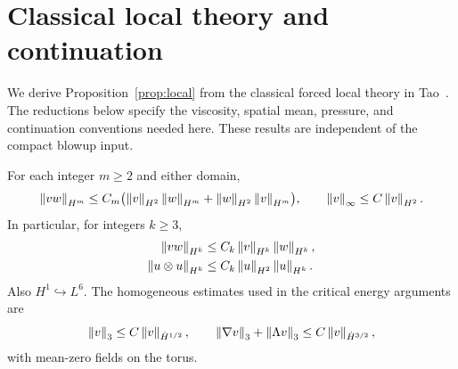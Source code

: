 \section{Classical local theory and continuation}\label{sec:local-appendix}
We derive Proposition~\ref{prop:local} from the classical forced local
theory in Tao~\cite[Theorems~5.1 and~5.4]{tao2013}. The reductions below
specify the viscosity, spatial mean, pressure, and continuation conventions
needed here. These results are independent of the compact blowup input.

\begin{lemma}\label{lem:calculus}
For each integer $m\ge2$ and either domain,
\begin{equation}\label{eq:Rproduct}
 \left\lVert vw\right\rVert_{H^m}\le C_m\bigl(\left\lVert v\right\rVert_{H^2}\left\lVert w\right\rVert_{H^m}
                         +\left\lVert w\right\rVert_{H^2}\left\lVert v\right\rVert_{H^m}\bigr),
 \qquad \left\lVert v\right\rVert_\infty\le C\left\lVert v\right\rVert_{H^2}.
\end{equation}
In particular, for integers $k\ge3$,
\begin{align}
 \left\lVert vw\right\rVert_{H^k}&\le C_k\left\lVert v\right\rVert_{H^k}\left\lVert w\right\rVert_{H^k},\label{eq:algebra}\\
 \left\lVert u\otimes u\right\rVert_{H^k}&\le C_k\left\lVert u\right\rVert_{H^2}\left\lVert u\right\rVert_{H^k}.
 \label{eq:tame}
\end{align}
Also $H^1\hookrightarrow L^6$. The homogeneous estimates used in the
critical energy arguments are
\begin{equation}\label{eq:embeddings}
 \left\lVert v\right\rVert_3\le C\left\lVert v\right\rVert_{\dot H^{1/2}},\qquad
 \left\lVert\nabla v\right\rVert_3+\left\lVert\Lambda v\right\rVert_3\le C\left\lVert v\right\rVert_{\dot H^{3/2}},
\end{equation}
with mean-zero fields on the torus.
\end{lemma}

